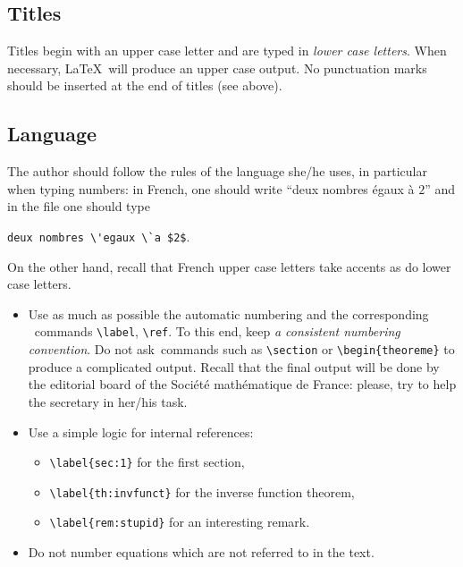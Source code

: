 \documentclass[11pt,english]{smfart}
\newcommand{\SmF}{Soci\'et\'e ma\-th\'e\-ma\-ti\-que de France}
\begin{document}
\subsection{Titles}

Titles begin with an upper case letter and are typed in {\em lower case letters}.
When necessary, \LaTeX\ will produce an upper case output.
No punctuation marks should be inserted at the end of titles (see above).

\subsection{Language}

The author should follow the rules of the language she/he uses, in particular when typing numbers:
in French, one should write ``deux nombres \'egaux \`a $2$'' and in the file one should type

\verb|deux nombres \'egaux \`a $2$|.

\noindent
On the other hand, recall that French upper case letters take accents as do lower case letters.


\begin{itemize}
\item
Use as much as possible the automatic numbering and the corresponding \LaTeXe\ commands \verb|\label|, \verb|\ref|. To this end, keep {\em a consistent numbering convention}. Do not \og ask\fg\ commands such as
\verb|\section| or \verb|\begin{theoreme}| to produce a complicated output. Recall that the final output will be done by the editorial board of the \SmF: please, try to help the secretary in her/his task.

\item
Use a simple logic for internal references:
\begin{itemize}
\item
\verb|\label{sec:1}| for the first section,

\item
\verb|\label{th:invfunct}| for the inverse function theorem,

\item
\verb|\label{rem:stupid}| for an interesting remark.
\end{itemize}

\item
Do not number equations which are not referred to in the text.
\end{itemize}
\end{document}
